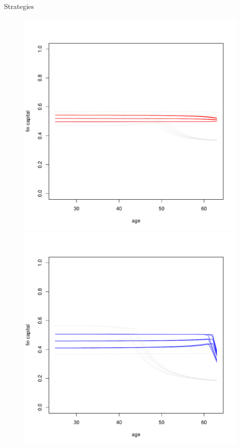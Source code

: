 \documentclass{beamer}
\begin{document}
\begin{frame}[allowframebreaks]{Strategies}
\begin{itemize}
\begin{figure}[H]
		\includegraphics[scale=0.25]{figs/hmunkhouse15.pdf}
		\includegraphics[scale=0.25]{figs/smunkhouse3.pdf}

\end{figure}
\end{itemize}
\end{frame}
\end{document}
